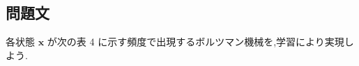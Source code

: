 \documentclass[a4j, uplatex, fleqn, dvipdfmx]{jsarticle} %
\begin{document}
\subsection{問題文}
各状態 $\bm{x}$ が次の表 4 に示す頻度で出現するボルツマン機械を,学習により実現しよう.




\end{document}
